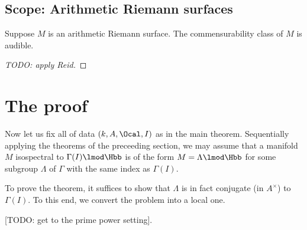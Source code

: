 \documentclass{amsart}
\begin{document}
\subsection{Scope: Arithmetic Riemann surfaces}
\begin{thm}
	Suppose $M$ is an arithmetic Riemann surface. The commensurability class
	of $M$ is audible. \end{thm}
\begin{proof}
	[TODO: apply Reid]
\end{proof}
\section{The proof}
Now let us fix all of data $(k, A , \Ocal, I)$ as in the main theorem. Sequentially applying the
theorems of the preceeding section, we may assume that a manifold $M$
isospectral to $\Gamma(I) \lmod \Hbb$ is of the form $M = \Lambda \lmod \Hbb$
for some subgroup $\Lambda$ of $\Gamma$ with the same index as  $\Gamma(I)$.

To prove the theorem, it suffices to show that $\Lambda$ is in fact conjugate
(in $A^\times$) to $\Gamma(I)$. To this end, we convert the problem into a local
one.

	[TODO: get to the prime power setting].
\end{document}
